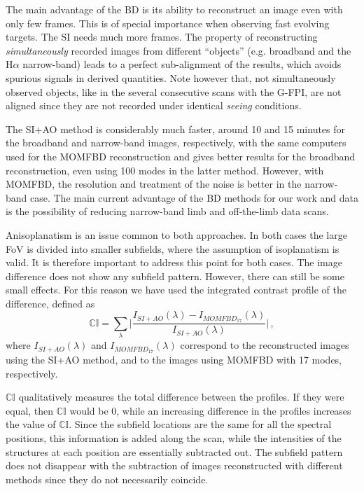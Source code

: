 The main advantage of the BD is its ability to reconstruct an image even with only few frames. This is of special importance when observing fast evolving targets. The SI needs much more frames. The property of reconstructing \emph{simultaneously} recorded images from different ``objects'' (e.g. broadband and the H$\alpha$ narrow-band) leads to a perfect sub-alignment of the results, which avoids spurious signals in derived quantities. Note however that, not simultaneously observed objects, like in the several consecutive scans with the G-FPI, are not aligned since they are not recorded under identical \emph{seeing} conditions.

The SI+AO method is considerably much faster, around 10 and 15 minutes for the broadband and narrow-band images, respectively, with the same computers used for the MOMFBD reconstruction and gives better results for the broadband reconstruction, even using 100 modes in the latter method. However, with MOMFBD, the resolution and treatment of the noise is better in the narrow-band case. The main current advantage of the BD methods for our work and data is the possibility of reducing narrow-band limb and off-the-limb data scans.


Anisoplanatism is an issue common to both approaches. In both cases the large FoV is divided into smaller subfields, where the assumption of isoplanatism is valid. It is therefore important to address this point for both cases. The image difference does not show any subfield pattern. However, there can still be some small effects. For this reason we have used the integrated contrast profile of the difference, defined as
\begin{equation}
\mathbb{CI}=\sum_{\lambda} \Big | \frac{I_{SI+AO}(\lambda)-I_{MOMFBD_{17}}(\lambda)}{I_{SI+AO}(\lambda)} \Big|\, ,
\end{equation}
where $I_{SI+AO}(\lambda)$ and  $I_{MOMFBD_{17}}(\lambda)$ correspond to the reconstructed images using the SI+AO method, and  to the images using MOMFBD with 17 modes, respectively.

$\mathbb{CI}$ qualitatively measures the total difference between the profiles. If they were equal, then $\mathbb{CI}$ would be 0, while an increasing difference in the profiles increases the value of $\mathbb{CI}$. Since the subfield locations are the same for all the spectral positions, this information is added along the scan, while the intensities of the structures at each position are essentially subtracted out. The subfield pattern does not disappear with the subtraction of images reconstructed with different methods since they do not necessarily coincide.

